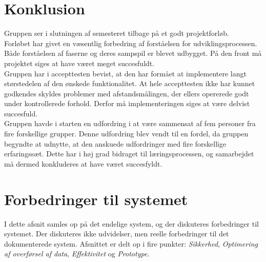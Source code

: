\chapter{Konklusion}
\label{ch:konklusion}
Gruppen ser i slutningen af semesteret tilbage på et godt projektforløb. \\
Forløbet har givet en væsentlig forbedring af forståelsen for udviklingsprocessen. Både forståelsen af faserne og deres sampspil er blevet udbygget. På den front må projektet siges at have været meget succesfuldt.\\
Gruppen har i accepttesten bevist, at den har formået at implementere langt størstedelen af den ønskede funktionalitet. At hele accepttesten ikke har kunnet godkendes skyldes problemer med afstandsmålingen, der ellers opererede godt under kontrollerede forhold. Derfor må implementeringen siges at være delvist succesfuld.\\
Gruppen havde i starten en udfordring i at være sammensat af fem personer fra fire forskellige grupper. Denne udfordring blev vendt til en fordel, da gruppen begyndte at udnytte, at den anskuede udfordringer med fire forskellige erfaringssæt. Dette har i høj grad bidraget til læringsprocessen, og samarbejdet må dermed konkluderes at have været succesfyldt.\\

\chapter{Forbedringer til systemet}
\label{ch:Forbedringer}
I dette afsnit samles op på det endelige system, og der diskuteres forbedringer til systemet. Der diskuteres ikke udvidelser, men reelle forbedringer til det dokumenterede system. Afsnittet er delt op i fire punkter: \textit{Sikkerhed}, \textit{Optimering af overførsel af data}, \textit{Effektivitet} og \textit{Prototype}. 

